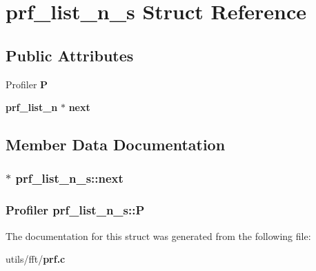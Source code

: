 \section{prf\_\-list\_\-n\_\-s Struct Reference}
\label{structprf__list__n__s}
\subsection*{Public Attributes}
\begin{CompactItemize}
\item 
Profiler {\bf P}
\item 
{\bf prf\_\-list\_\-n} $\ast$ {\bf next}
\end{CompactItemize}


\subsection{Member Data Documentation}
\subsubsection{$\ast$ {\bf prf\_\-list\_\-n\_\-s::next}}\label{structprf__list__n__s_460b89564a634dc5a2b617d263406e8b}


\subsubsection{\setlength{\rightskip}{0pt plus 5cm}Profiler {\bf prf\_\-list\_\-n\_\-s::P}}\label{structprf__list__n__s_739618efefba0eaf5e0e69115ab37cef}




The documentation for this struct was generated from the following file:\begin{CompactItemize}
\item 
utils/fft/{\bf prf.c}\end{CompactItemize}
